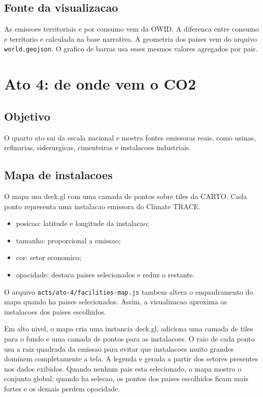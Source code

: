 \documentclass[12pt,a4paper]{article}
\begin{document}
\subsection{Fonte da visualizacao}

As emissoes territoriais e por consumo vem da OWID. A diferenca entre consumo e territorio e calculada na base narrativa. A geometria dos paises vem do arquivo \texttt{world.geojson}. O grafico de barras usa esses mesmos valores agregados por pais.

\section{Ato 4: de onde vem o CO2}

\subsection{Objetivo}

O quarto ato sai da escala nacional e mostra fontes emissoras reais, como usinas, refinarias, siderurgicas, cimenteiras e instalacoes industriais.

\subsection{Mapa de instalacoes}

O mapa usa deck.gl com uma camada de pontos sobre tiles da CARTO. Cada ponto representa uma instalacao emissora do Climate TRACE.

\begin{itemize}
  \item posicao: latitude e longitude da instalacao;
  \item tamanho: proporcional a emissao;
  \item cor: setor economico;
  \item opacidade: destaca paises selecionados e reduz o restante.
\end{itemize}

O arquivo \texttt{acts/ato-4/facilities-map.js} tambem altera o enquadramento do mapa quando ha paises selecionados. Assim, a visualizacao aproxima as instalacoes dos paises escolhidos.

Em alto nivel, o mapa cria uma instancia deck.gl, adiciona uma camada de tiles para o fundo e uma camada de pontos para as instalacoes. O raio de cada ponto usa a raiz quadrada da emissao para evitar que instalacoes muito grandes dominem completamente a tela. A legenda e gerada a partir dos setores presentes nos dados exibidos. Quando nenhum pais esta selecionado, o mapa mostra o conjunto global; quando ha selecao, os pontos dos paises escolhidos ficam mais fortes e os demais perdem opacidade.
\end{document}
